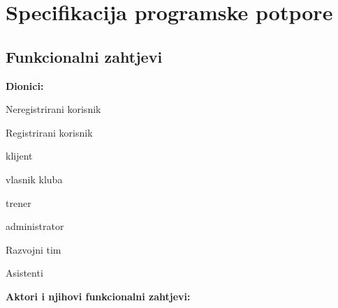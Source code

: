 \chapter{Specifikacija programske potpore}
		
	\section{Funkcionalni zahtjevi}
			\noindent \textbf{Dionici:}
			
	\begin{packed_enum}
				\item  Neregistrirani korisnik
				\item  Registrirani korisnik 
					\begin{packed_enum}
						
						\item  klijent
						\item  vlasnik kluba
						\item  trener
						\item administrator
				
					\end{packed_enum}

				\item Razvojni tim
				\item Asistenti
										
			\end{packed_enum}
			
			\noindent \textbf{Aktori i njihovi funkcionalni zahtjevi:}
			
